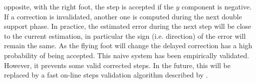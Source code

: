 opposite, with the right foot, the step is accepted if the $y$
component is negative.
%
%
If a correction is invalidated, another one is computed during the
next double support phase. In practice, the estimated error during the
next step will be close to the current estimation, in particular the
sign (i.e. direction) of the error will remain the same. As the flying
foot will change the delayed correction has a high probability of
being accepted.
%
%
This naive system has been empirically validated. However, it prevents
some valid corrected steps. In the future, this will be replaced by a
fast on-line steps validation algorithm described by
\cite{10icra.perrin}.
%
\FloatBarrier
%

